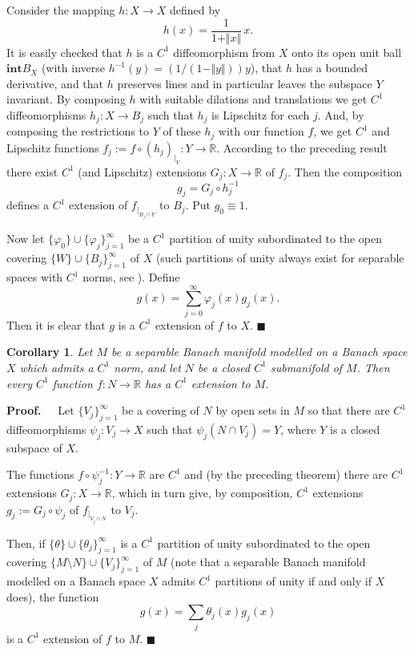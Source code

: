 \documentclass[11pt]{amsproc}%
\theoremstyle{plain}
\newtheorem{corollary}{Corollary}
\numberwithin{equation}{section}
\begin{document}
Consider the mapping $h:X\rightarrow X$ defined by
\[
h(x)=\frac{1}{1+\Vert x\Vert}\,x.
\]
It is easily checked that $h$ is a $C^{1}$ diffeomorphism from $X$ onto its
open unit ball $\mathbf{int}B_{X}$ (with inverse $h^{-1}(y)=\left(  1/(1-\Vert
y\Vert)\right)  y$), that $h$ has a bounded derivative, and that $h$ preserves
lines and in particular leaves the subspace $Y$ invariant. By composing $h$
with suitable dilations and translations we get $C^{1}$ diffeomorphisms
$h_{j}:X\rightarrow B_{j}$ such that $h_{j}$ is Lipschitz for each $j$. And,
by composing the restrictions to $Y$ of these $h_{j}$ with our function $f$,
we get $C^{1}$ and Lipschitz functions $f_{j}:=f\circ(h_{j})_{|_{Y}%
}:Y\rightarrow\mathbb{R}$. According to the preceding result there exist
$C^{1}$ (and Lipschitz) extensions $G_{j}:X\rightarrow\mathbb{R}$ of $f_{j}$.
Then the composition
\[
g_{j}=G_{j}\circ h_{j}^{-1}%
\]
defines a $C^{1}$ extension of $f_{|_{B_{j}\cap Y}}$ to $B_{j}$. Put
$g_{0}\equiv1.$

Now let $\{\varphi_{0}\}\cup\{\varphi_{j}\}_{j=1}^{\infty}$ be a $C^{1}$
partition of unity subordinated to the open covering $\{W\}\cup\{B_{j}%
\}_{j=1}^{\infty}$ of $X$ (such partitions of unity always exist for separable
spaces with $C^{1}$ norms, see \cite[Theorem VIII.3.2, page 351]{DGZ}).
Define
\[
g(x)=\sum_{j=0}^{\infty}\varphi_{j}(x)g_{j}(x).
\]
Then it is clear that $g$ is a $C^{1}$ extension of $f$ to $X$. $\blacksquare$

\bigskip

\begin{corollary}
Let $M$ be a separable Banach manifold modelled on a Banach space $X$ which
admits a $C^{1}$ norm, and let $N$ be a closed $C^{1}$ submanifold of $M$.
Then every $C^{1}$ function $f:N\to\mathbb{R}$ has a $C^{1}$ extension to $M$.
\end{corollary}

\noindent\textbf{Proof.\ \ } Let $\{V_{j}\}_{j=1}^{\infty}$ be a covering of
$N$ by open sets in $M$ so that there are $C^{1}$ diffeomorphisms $\psi
_{j}:V_{j}\to X$ such that $\psi_{j} (N\cap V_{j})=Y$, where $Y$ is a closed
subspace of $X$.

The functions $f\circ\psi_{j}^{-1}:Y\to\mathbb{R}$ are $C^{1}$ and (by the
preceding theorem) there are $C^{1}$ extensions $G_{j}:X\to\mathbb{R}$, which
in turn give, by composition, $C^{1}$ extensions $g_{j}:=G_{j}\circ\psi_{j}$
of $f_{|_{V_{j}\cap N}}$ to $V_{j}$.

Then, if $\{\theta\}\cup\{\theta_{j}\}_{j=1}^{\infty}$ is a $C^{1}$ partition
of unity subordinated to the open covering $\{M\setminus N\}\cup
\{V_{j}\}_{j=1}^{\infty}$ of $M$ (note that a separable Banach manifold
modelled on a Banach space $X$ admits $C^{1}$ partitions of unity if and only
if $X$ does), the function
\[
g(x)=\sum_{j}\theta_{j}(x)g_{j}(x)
\]
is a $C^{1}$ extension of $f$ to $M$. $\blacksquare$
\end{document}

